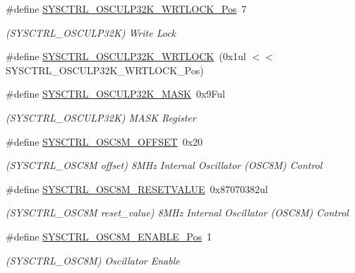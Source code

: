 \begin{DoxyCompactItemize}
\item 
\#define \mbox{\hyperlink{group___s_a_m_d21___s_y_s_c_t_r_l_ga7da3970d867090ddea43523449c67e26}{S\+Y\+S\+C\+T\+R\+L\+\_\+\+O\+S\+C\+U\+L\+P32\+K\+\_\+\+W\+R\+T\+L\+O\+C\+K\+\_\+\+Pos}}~7
\begin{DoxyCompactList}\small\item\em (S\+Y\+S\+C\+T\+R\+L\+\_\+\+O\+S\+C\+U\+L\+P32K) Write Lock \end{DoxyCompactList}\item 
\#define \mbox{\hyperlink{group___s_a_m_d21___s_y_s_c_t_r_l_ga46a5a1b46478fb24ca829169ff5558e4}{S\+Y\+S\+C\+T\+R\+L\+\_\+\+O\+S\+C\+U\+L\+P32\+K\+\_\+\+W\+R\+T\+L\+O\+CK}}~(0x1ul $<$$<$ S\+Y\+S\+C\+T\+R\+L\+\_\+\+O\+S\+C\+U\+L\+P32\+K\+\_\+\+W\+R\+T\+L\+O\+C\+K\+\_\+\+Pos)
\item 
\#define \mbox{\hyperlink{group___s_a_m_d21___s_y_s_c_t_r_l_gac85271b1c07926da7a5f8d836b37035e}{S\+Y\+S\+C\+T\+R\+L\+\_\+\+O\+S\+C\+U\+L\+P32\+K\+\_\+\+M\+A\+SK}}~0x9\+Ful
\begin{DoxyCompactList}\small\item\em (S\+Y\+S\+C\+T\+R\+L\+\_\+\+O\+S\+C\+U\+L\+P32K) M\+A\+SK Register \end{DoxyCompactList}\item 
\#define \mbox{\hyperlink{group___s_a_m_d21___s_y_s_c_t_r_l_ga9fe2b9ffb2ab9daac78b5ecf36e4faa1}{S\+Y\+S\+C\+T\+R\+L\+\_\+\+O\+S\+C8\+M\+\_\+\+O\+F\+F\+S\+ET}}~0x20
\begin{DoxyCompactList}\small\item\em (S\+Y\+S\+C\+T\+R\+L\+\_\+\+O\+S\+C8M offset) 8M\+Hz Internal Oscillator (O\+S\+C8M) Control \end{DoxyCompactList}\item 
\#define \mbox{\hyperlink{group___s_a_m_d21___s_y_s_c_t_r_l_gad29974bd4721c3ed4df3c02e2dfaf41f}{S\+Y\+S\+C\+T\+R\+L\+\_\+\+O\+S\+C8\+M\+\_\+\+R\+E\+S\+E\+T\+V\+A\+L\+UE}}~0x87070382ul
\begin{DoxyCompactList}\small\item\em (S\+Y\+S\+C\+T\+R\+L\+\_\+\+O\+S\+C8M reset\+\_\+value) 8M\+Hz Internal Oscillator (O\+S\+C8M) Control \end{DoxyCompactList}\item 
\#define \mbox{\hyperlink{group___s_a_m_d21___s_y_s_c_t_r_l_ga9529c657d912115ddb23093e7de40f54}{S\+Y\+S\+C\+T\+R\+L\+\_\+\+O\+S\+C8\+M\+\_\+\+E\+N\+A\+B\+L\+E\+\_\+\+Pos}}~1
\begin{DoxyCompactList}\small\item\em (S\+Y\+S\+C\+T\+R\+L\+\_\+\+O\+S\+C8M) Oscillator Enable \end{DoxyCompactList}\item 
$$
\end{DoxyCompactItemize}
